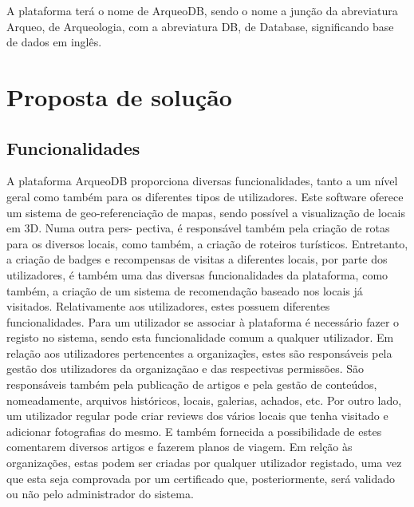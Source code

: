 ﻿\documentclass[12pt,a4paper]{article}
\begin{document}
A plataforma terá o nome de ArqueoDB, sendo o nome a junção da abreviatura Arqueo,
de Arqueologia, com a abreviatura DB, de Database, significando base de dados em inglês.

\section{Proposta de solução}
\subsection{Funcionalidades}
A plataforma ArqueoDB proporciona diversas funcionalidades, tanto a um nível geral
como também para os diferentes tipos de utilizadores. Este software oferece um sistema de geo-referenciação de mapas, sendo possível a visualização de locais em 3D. Numa outra pers-
pectiva, é responsável também pela criação de rotas para os diversos locais, como também,
a criação de roteiros turísticos. Entretanto, a criação de badges e recompensas de visitas
a diferentes locais, por parte dos utilizadores, é também uma das diversas funcionalidades
da plataforma, como também, a criação de um sistema de recomendação baseado nos locais
já visitados. Relativamente aos utilizadores, estes possuem diferentes funcionalidades. Para
um utilizador se associar à plataforma é necessário fazer o registo no sistema, sendo esta funcionalidade comum a qualquer utilizador. Em relação aos utilizadores pertencentes a organizaçĩes, estes são responsáveis pela gestão dos utilizadores da organizaçãao e das respectivas
permissões. São responsáveis também pela publicação de artigos e pela gestão de conteúdos, nomeadamente, arquivos históricos, locais, galerias, achados, etc. Por outro lado, um utilizador regular pode criar reviews dos vários locais que tenha visitado e adicionar fotografias do mesmo. E também fornecida a possibilidade de estes comentarem diversos artigos e fazerem planos de viagem. Em relção às organizações, estas podem ser criadas por qualquer utilizador registado, uma vez que esta seja comprovada por um certificado que, posteriormente, será validado ou não pelo administrador do sistema.\\
\end{document}
